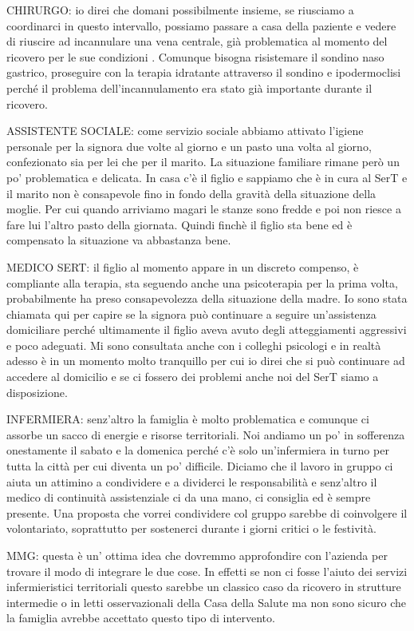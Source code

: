 \documentclass[]{article}
\begin{document}
CHIRURGO: io direi che domani possibilmente insieme, se riusciamo a
coordinarci in questo intervallo, possiamo passare a casa della paziente
e vedere di riuscire ad incannulare una vena centrale, già problematica
al momento del ricovero per le sue condizioni . Comunque bisogna
risistemare il sondino naso gastrico, proseguire con la terapia
idratante attraverso il sondino e ipodermoclisi perché il problema
dell'incannulamento era stato già importante durante il ricovero.

ASSISTENTE SOCIALE: come servizio sociale abbiamo attivato l'igiene
personale per la signora due volte al giorno e un pasto una volta al
giorno, confezionato sia per lei che per il marito. La situazione
familiare rimane però un po' problematica e delicata. In casa c'è il
figlio e sappiamo che è in cura al SerT e il marito non è consapevole
fino in fondo della gravità della situazione della moglie. Per cui
quando arriviamo magari le stanze sono fredde e poi non riesce a fare
lui l'altro pasto della giornata. Quindi finchè il figlio sta bene ed è
compensato la situazione va abbastanza bene.

MEDICO SERT: il figlio al momento appare in un discreto compenso, è
compliante alla terapia, sta seguendo anche una psicoterapia per la
prima volta, probabilmente ha preso consapevolezza della situazione
della madre. Io sono stata chiamata qui per capire se la signora può
continuare a seguire un'assistenza domiciliare perché ultimamente il
figlio aveva avuto degli atteggiamenti aggressivi e poco adeguati. Mi
sono consultata anche con i colleghi psicologi e in realtà adesso è in
un momento molto tranquillo per cui io direi che si può continuare ad
accedere al domicilio e se ci fossero dei problemi anche noi del SerT
siamo a disposizione.

INFERMIERA: senz'altro la famiglia è molto problematica e comunque ci
assorbe un sacco di energie e risorse territoriali. Noi andiamo un po'
in sofferenza onestamente il sabato e la domenica perché c'è solo
un'infermiera in turno per tutta la città per cui diventa un po'
difficile. Diciamo che il lavoro in gruppo ci aiuta un attimino a
condividere e a dividerci le responsabilità e senz'altro il medico di
continuità assistenziale ci da una mano, ci consiglia ed è sempre
presente. Una proposta che vorrei condividere col gruppo sarebbe di
coinvolgere il volontariato, soprattutto per sostenerci durante i giorni
critici o le festività.

MMG: questa è un' ottima idea che dovremmo approfondire con l'azienda
per trovare il modo di integrare le due cose. In effetti se non ci fosse
l'aiuto dei servizi infermieristici territoriali questo sarebbe un
classico caso da ricovero in strutture intermedie o in letti
osservazionali della Casa della Salute ma non sono sicuro che la
famiglia avrebbe accettato questo tipo di intervento.
\end{document}
